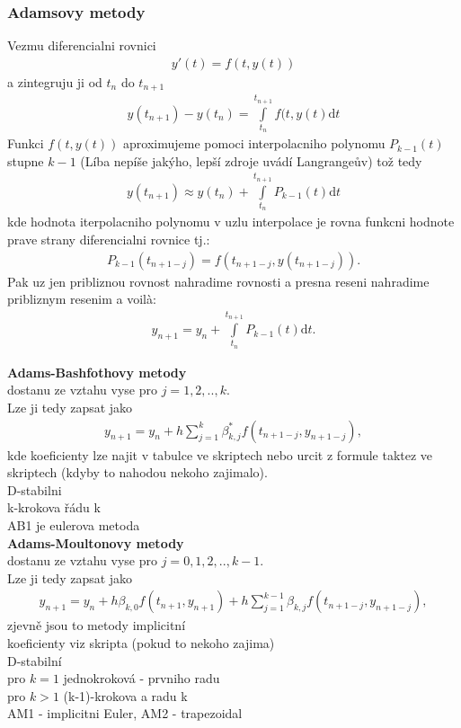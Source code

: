\documentclass[a4]{report}
\theoremstyle{definition}
\begin{document}
{\subsubsection*{Adamsovy metody}

Vezmu diferencialni rovnici
\begin{align}
y'(t)= f(t,y(t))
\end{align}
a zintegruju ji od $t_{n}$ do $t_{n+1}$
\begin{align*}
y(t_{n+1})-y(t_{n}) = \int \limits_{t_{n}}^{t_{n+1}} f(t,y(t) \mathrm{d}t
\end{align*}
Funkci $f(t,y(t))$ aproximujeme pomoci interpolacniho polynomu $P_{k-1}(t)$ stupne $k-1$ (Líba nepíše jakýho, lepší zdroje uvádí Langrangeův) tož tedy
\begin{align}
y(t_{n+1}) \approx y(t_{n}) + \int \limits _{t_{n}}^{t_{n+1}} P_{k-1}(t) \mathrm{d}t
\end{align}
kde hodnota iterpolacniho polynomu v uzlu interpolace je rovna funkcni hodnote prave strany diferencialni rovnice tj.:
\begin{align}
P_{k-1}(t_{n+1-j}) = f(t_{n+1-j},y(t_{n+1-j})).
\end{align}
Pak uz jen pribliznou rovnost nahradime rovnosti a presna reseni nahradime pribliznym resenim a voilà:
\begin{align}
y_{n+1}=y_{n}+ \int \limits _{t_{n}}^{t_{n+1}} P_{k-1}(t) \mathrm{d}t.
\end{align}

\textbf{Adams-Bashfothovy metody}
\\ dostanu ze vztahu vyse pro $j=1,2,..,k$. \\
Lze ji tedy zapsat jako \begin{align}
 y_{n+1}=y_{n} + h \sum _{j=1}^{k} \beta^{*}_{k,j} f(t_{n+1-j}, y_{n+1-j}),
\end{align}
kde koeficienty lze najit v tabulce ve skriptech nebo urcit z formule taktez ve skriptech (kdyby to nahodou nekoho zajimalo). 
 \\
D-stabilni \\
k-krokova  řádu k\\
AB1 je eulerova metoda \\

\textbf{Adams-Moultonovy metody}\\
dostanu ze vztahu vyse pro $j=0,1,2,..,k-1$. \\
Lze ji tedy zapsat jako \begin{align}
 y_{n+1}=y_{n} +h \beta_{k,0} f(t_{n+1},y_{n+1})+ h \sum _{j=1}^{k-1} \beta_{k,j} f(t_{n+1-j}, y_{n+1-j}),
\end{align}
zjevně jsou to metody implicitní \\
koeficienty viz skripta (pokud to nekoho zajima) \\
D-stabilní \\
pro $k=1$ jednokroková - prvniho radu \\
pro $k > 1$ (k-1)-krokova a radu k\\
AM1 - implicitni Euler, AM2 - trapezoidal

}
\end{document}
